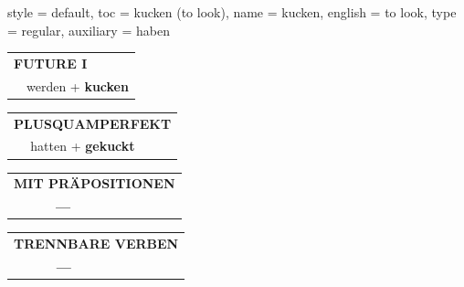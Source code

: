 \begin{verbentry}{
  style = {default},
  toc = {kucken (to look)},
  name = {kucken},
  english = {to look},
  type = {regular},
  auxiliary = {haben}
}
\begin{tabular}{rl}
    \multicolumn{2}{l}{\textbf{FUTURE I} }\\
   & werden + \textbf{kucken}\\
 
  \end{tabular}
\hfill
   \begin{tabular}{rl}
      \multicolumn{2}{l}{\textbf{PLUSQUAMPERFEKT}}\\
   & hatten + \textbf{gekuckt}\\
  \end{tabular}
  
  \vspace{10pt}



\begin{tabular}{lll}
\multicolumn{3}{l}{\textbf{MIT PRÄPOSITIONEN}}\\
& \textbf{---} & \\
\end{tabular}
\hfill
\begin{tabular}{lll}
\multicolumn{3}{l}{\textbf{TRENNBARE VERBEN}}\\
& \textbf{---} & \\
\end{tabular}

  \vspace{-5pt}
\end{verbentry}

